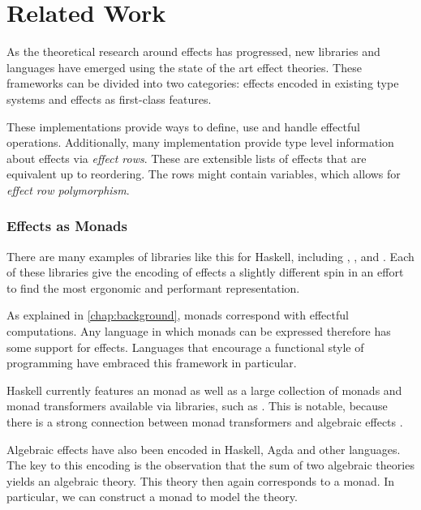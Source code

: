 \chapter{Related Work}\label{chap:related_work}

As the theoretical research around effects has progressed, new libraries and languages have emerged using the state of the art effect theories. These frameworks can be divided into two categories: effects encoded in existing type systems and effects as first-class features.

These implementations provide ways to define, use and handle effectful operations. Additionally, many implementation provide type level information about effects via \emph{effect rows}. These are extensible lists of effects that are equivalent up to reordering. The rows might contain variables, which allows for \emph{effect row polymorphism}.

\subsection{Effects as Monads}

There are many examples of libraries like this for Haskell, including , ,  and . Each of these libraries give the encoding of effects a slightly different spin in an effort to find the most ergonomic and performant representation.

As explained in \cref{chap:background}, monads correspond with effectful computations. Any language in which monads can be expressed therefore has some support for effects. Languages that encourage a functional style of programming have embraced this framework in particular.

Haskell currently features an  monad \autocite{peyton_jones_imperative_1993} as well as a large collection of monads and monad transformers available via libraries, such as . This is notable, because there is a strong connection between monad transformers and algebraic effects \autocite{schrijvers_monad_2019}.

Algebraic effects have also been encoded in Haskell, Agda and other languages. The key to this encoding is the observation that the sum of two algebraic theories yields an algebraic theory. This theory then again corresponds to a monad. In particular, we can construct a  monad to model the theory.\citationneeded

